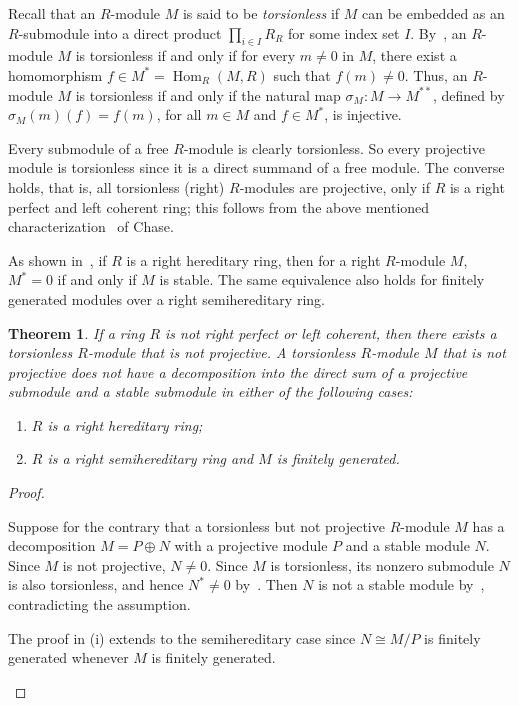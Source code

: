 \documentclass[11pt,a4paper]{amsart}
\theoremstyle{plain}
\newtheorem{theorem}{Theorem}[section]
\theoremstyle{definition}
\theoremstyle{remark}
\newcommand{\parantezicindeenumi}[1][\roman]{\renewcommand{\theenumi}{#1{enumi}}
\renewcommand{\labelenumi}{(\theenumi)} }
\newcommand{\Hom}{\operatorname{Hom}}
\begin{document}
Recall that an $R$-module $M$ is said to be \emph{torsionless} if $M$ can be embedded as an $R$-submodule into a direct product $\prod_{i\in I} R_R$ for some index set $I$. By~\cite[Remark 4.65(a)]{Lam:LecturesOnModulesAndRings}, an $R$-module $M$ is torsionless if and only if for every $m \neq0$ in $M$, there exist a homomorphism $f\in M^{\ast}=\Hom_{R}(M,R)$ such that $f(m)\neq 0$. Thus, an $R$-module $M$ is torsionless if and only if the natural map $ {\sigma_M} : M  \rightarrow M^{\ast\ast} $, defined {by $ {\sigma_M}(m)(f)=f(m) $, for all $ m\in M $ and $ f\in M^* $}, is injective.

Every submodule of a free $R$-module is clearly torsionless. So every projective module is torsionless since it is a direct summand of a free module. The converse holds, that is, all torsionless (right) $R$-modules are projective, only if $R$ is a right perfect and left coherent ring; this follows from the above mentioned characterization~\cite[Theorem 3.3]{Chase:DirectProductsOfModules} of Chase. 

As shown in~\cite[Lemma 2.6]{Martsinkovsky:TheStableCategoryOfALeftHereditaryRing}, if $R$ is a right hereditary ring, then for a right $R$-module $M$, $M^*=0$ if and only if $M$ is stable. The same equivalence also holds for finitely generated modules over a right semihereditary ring.

\begin{theorem}
\label{theorem:hereditary-not-right-perfect-or-left-coherent}
 \parantezicindeenumi
If a ring $R$ is not right perfect or left coherent, then there exists a torsionless $R$-module that is not projective. A torsionless $ R $-module $ M $ that is not projective does not  have a decomposition into the direct sum of a projective submodule and a stable submodule {in either of the following cases}:
\begin{enumerate}
 \item $R$ is a right hereditary ring;  
  \item $R$ is a right semihereditary ring and $ M $ is finitely generated.
\end{enumerate}

\end{theorem}
\begin{proof} 
\parantezicindeenumi
\begin{enumerate}
\item Suppose for the contrary that a torsionless but not projective $R$-module $M$ has a decomposition $M=P\oplus N$ with a projective module $P$ and a stable module $N$. Since $M$ is not projective, $N\neq 0$. Since $M$ is torsionless, its nonzero submodule $N$ is also torsionless, and hence $N^\ast \neq 0$ by~\cite[Remark 4.65(a)]{Lam:LecturesOnModulesAndRings}. Then $N$ is not a stable module by~\cite[Lemma 2.6]{Martsinkovsky:TheStableCategoryOfALeftHereditaryRing}, contradicting the assumption.
{\item {The proof in (i) extends to the semihereditary case} since  $ N \cong M/P$ is  finitely generated whenever $ M $ is finitely generated.}
\end{enumerate}
\end{proof}
\end{document}
